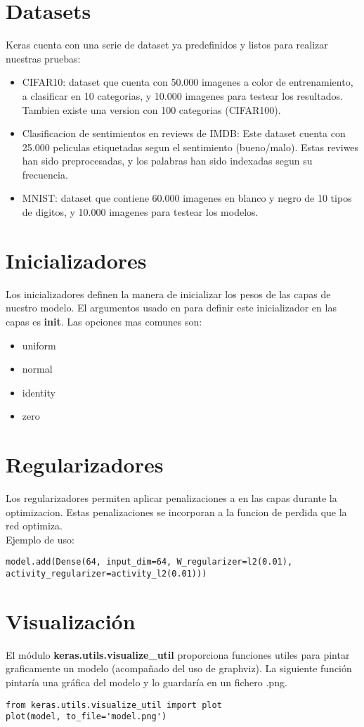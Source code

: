 \section{Datasets}
Keras cuenta con una serie de dataset ya predefinidos y listos para realizar nuestras pruebas:
\begin{itemize}
\item CIFAR10: dataset que cuenta con 50.000 imagenes a color de entrenamiento, a clasificar en 10 categorias, y 10.000 imagenes para testear los resultados. Tambien existe una version con 100 categorias (CIFAR100).
\item Clasificacion de sentimientos en reviews de IMDB: Este dataset cuenta con 25.000 peliculas etiquetadas segun el sentimiento (bueno/malo). Estas reviwes han sido preprocesadas, y los palabras han sido indexadas segun su frecuencia.
\item MNIST: dataset que contiene 60.000 imagenes en blanco y negro de 10 tipos de digitos, y 10.000 imagenes para testear los modelos.
\end{itemize}
\section{Inicializadores}
Los inicializadores definen la manera de inicializar los pesos de las capas de nuestro modelo. El argumentos usado en para definir este inicializador en las capas es \textbf{init}. Las opciones mas comunes son:
\begin{itemize}[noitemsep]
\item uniform
\item normal
\item identity
\item zero
\end{itemize}
\section{Regularizadores}
Los regularizadores permiten aplicar penalizaciones a en las capas durante la optimizacion. Estas penalizaciones se incorporan a la funcion de perdida que la red optimiza.\\
Ejemplo de uso:
\begin{verbatim}
model.add(Dense(64, input_dim=64, W_regularizer=l2(0.01), activity_regularizer=activity_l2(0.01)))
\end{verbatim}
\section{Visualización}
El módulo \textbf{keras.utils.visualize\_util} proporciona funciones utiles para pintar graficamente un modelo (acompañado del uso de graphviz). La siguiente función pintaría una gráfica del modelo y lo guardaría en un fichero .png.
\begin{verbatim}
from keras.utils.visualize_util import plot
plot(model, to_file='model.png')
\end{verbatim}

